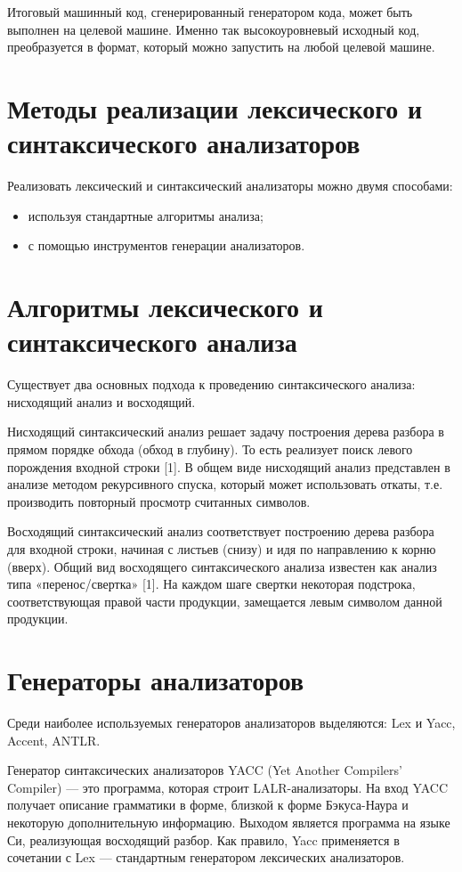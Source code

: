 Итоговый машинный код, сгенерированный генератором кода, может быть выполнен на целевой машине.
Именно так высокоуровневый исходный код, преобразуется в формат, который можно запустить на любой целевой машине.

\section{Методы реализации лексического и синтаксического анализаторов}

Реализовать лексический и синтаксический анализаторы можно двумя
способами:
\begin{itemize}
	\item используя стандартные алгоритмы анализа;
	\item с помощью инструментов генерации анализаторов.
\end{itemize}

\section{Алгоритмы лексического и синтаксического анализа}

Существует два основных подхода к проведению синтаксического анализа: нисходящий анализ и восходящий.

Нисходящий синтаксический анализ решает задачу построения дерева разбора в прямом порядке обхода (обход в глубину).
То есть реализует поиск левого порождения входной строки [1].
В общем виде нисходящий анализ представлен в анализе методом рекурсивного спуска, который может использовать откаты, т.е. производить повторный просмотр считанных символов.

Восходящий синтаксический анализ соответствует построению дерева разбора для входной строки, начиная с листьев (снизу) и идя по направлению к корню (вверх).
Общий вид восходящего синтаксического анализа известен как анализ типа «перенос/свертка» [1].
На каждом шаге свертки некоторая подстрока, соответствующая правой части продукции, замещается левым символом данной продукции.

\section{Генераторы анализаторов}

Среди наиболее используемых генераторов анализаторов выделяются: Lex и Yacc, Accent, ANTLR.

Генератор синтаксических анализаторов YACC (Yet Another Compilers' Compiler) — это программа, которая строит LALR-анализаторы.
На вход YACC получает описание грамматики в форме, близкой к форме Бэкуса-Наура и некоторую дополнительную информацию.
Выходом является программа на языке Си, реализующая восходящий разбор.
Как правило, Yacc применяется в сочетании с Lex — стандартным генератором лексических анализаторов.

